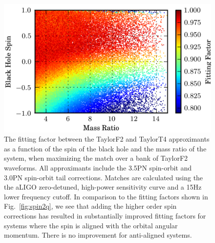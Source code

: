 \begin{figure}
\begin{center}
\includegraphics[width=1.0	\textwidth]{papers/nsbh_faithfulness/figure14.png}
\end{center}
\caption{\label{fig:spin2q7}The fitting factor between the TaylorF2 and
TaylorT4 approximants as a function of the spin of the black hole
and the mass ratio of the system, when maximizing the match over a bank of
TaylorF2 waveforms. All approximants include the 3.5\ac{PN} spin-orbit and 3.0\ac{PN} 
spin-orbit tail corrections. 
Matches are calculated using the the aLIGO
zero-detuned, high-power sensitivity curve and a 15Hz lower frequency cutoff. In 
comparison to the fitting factors shown in Fig.~\ref{fig:spin2q}, we see that adding
the higher order spin corrections has resulted in substantially improved fitting factors for 
systems where the spin is aligned with the orbital angular momentum. There is no 
improvement for anti-aligned systems.
}
\end{figure}



